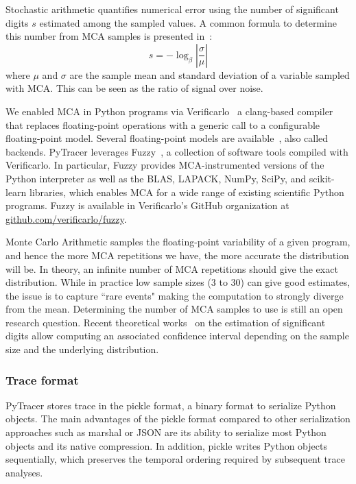 \documentclass[10pt,journal,compsoc]{IEEEtran}
\newcommand{\pytracer}[0]{PyTracer\xspace}
\DeclareRobustCommand{\remove}[1]{}
\DeclareRobustCommand{\remove}[1]{}
\begin{document}
Stochastic arithmetic quantifies numerical error using the number of significant
digits $s$ estimated among the sampled values. A common formula to determine
this number from MCA samples is presented in~\cite{parker1997monte}:
\begin{equation}
    s = -\log_{\beta}{ \left| \dfrac{\sigma}{\mu} \right|} \label{eq:sig-digits}
\end{equation}
where $\mu$ and $\sigma$ are the sample mean and standard deviation of a
variable sampled with MCA. This can be seen as the ratio of signal over noise.
\remove{Sohier et al.~\cite{sohier2021confidence} recently provided a generalization of
    this formula to include confidence intervals.}

We enabled MCA in Python programs via Verificarlo~\cite{verificarlo} a
clang-based compiler~\cite{lattner2008llvm} that replaces floating-point
operations with a generic call to a configurable floating-point model. Several
floating-point models are
available~\cite{chatelain2019automatic,chatelain2019outils}, also called
backends. \pytracer leverages Fuzzy~\cite{kiar2020comparing}, a collection of
software tools compiled with Verificarlo. In particular, Fuzzy provides
MCA-instrumented versions of the Python interpreter as well as the BLAS, LAPACK,
NumPy, SciPy, and scikit-learn libraries, which enables MCA for a wide range of
existing scientific Python programs. Fuzzy is available in Verificarlo's GitHub
organization at
\href{https://github.com/verificarlo/fuzzy}{\url{github.com/verificarlo/fuzzy}}.


Monte Carlo Arithmetic samples the floating-point variability of a given
program, and hence the more MCA repetitions we have, the more accurate the
distribution will be. In theory, an infinite number of MCA repetitions
should give the exact distribution. While in practice low sample sizes (3 to 30)
can give good estimates, the issue is to capture ``rare events" 
making the computation to strongly diverge from the mean. 
Determining the number of MCA samples to use is still an open research question. 
Recent theoretical works~\cite{sohier2021confidence} on the estimation of 
significant digits allow computing an associated confidence
interval depending on the sample size and the underlying
distribution.

\subsubsection{Trace format}

\pytracer stores trace in the pickle format, a binary format to serialize
Python objects. The main advantages of the pickle format compared to other
serialization approaches such as marshal or JSON are its ability to serialize
most Python objects and its native compression.  In addition, pickle writes
Python objects sequentially, which preserves the temporal ordering required by
subsequent trace analyses.
\end{document}
